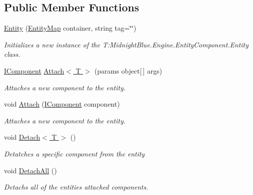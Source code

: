 \subsection*{Public Member Functions}
\begin{DoxyCompactItemize}
\item 
\hyperlink{class_midnight_blue_1_1_engine_1_1_entity_component_1_1_entity_acf9a2caa0ea2a1d1a021d8b96e0f5821}{Entity} (\hyperlink{class_midnight_blue_1_1_engine_1_1_entity_component_1_1_entity_map}{Entity\+Map} container, string tag=\char`\"{}\char`\"{})
\begin{DoxyCompactList}\small\item\em Initializes a new instance of the T\+:\+Midnight\+Blue.\+Engine.\+Entity\+Component.\+Entity class. \end{DoxyCompactList}\item 
\hyperlink{interface_midnight_blue_1_1_engine_1_1_entity_component_1_1_i_component}{I\+Component} \hyperlink{class_midnight_blue_1_1_engine_1_1_entity_component_1_1_entity_ac0f755703d44843aff237147fa2f49ff}{Attach$<$ T $>$} (params object\mbox{[}$\,$\mbox{]} args)
\begin{DoxyCompactList}\small\item\em Attaches a new component to the entity. \end{DoxyCompactList}\item 
void \hyperlink{class_midnight_blue_1_1_engine_1_1_entity_component_1_1_entity_a03dd4fbb29f2a0be51589726304725df}{Attach} (\hyperlink{interface_midnight_blue_1_1_engine_1_1_entity_component_1_1_i_component}{I\+Component} component)
\begin{DoxyCompactList}\small\item\em Attaches a new component to the entity. \end{DoxyCompactList}\item 
void \hyperlink{class_midnight_blue_1_1_engine_1_1_entity_component_1_1_entity_ab5b2a5d043014c5c4b3e97562df9f76a}{Detach$<$ T $>$} ()
\begin{DoxyCompactList}\small\item\em Detatches a specific component from the entity \end{DoxyCompactList}\item 
void \hyperlink{class_midnight_blue_1_1_engine_1_1_entity_component_1_1_entity_a2109f26da3d9f33ff2ab950498e87782}{Detach\+All} ()
\begin{DoxyCompactList}\small\item\em Detachs all of the entities attached components. \end{DoxyCompactList}\item 

\end{DoxyCompactItemize}
